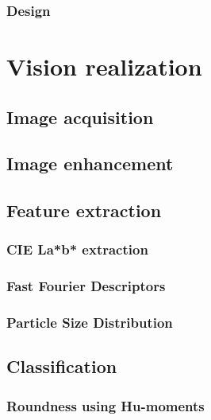 \documentclass[11pt,fleqn,,a4paper,twoside,openright]{book}
\begin{document}
\subsection{Design}

\chapter{Vision realization}


\section{Image acquisition}


\section{Image enhancement}


\section{Feature extraction}\label{Segmentation}


\subsection{CIE La*b* extraction}\label{CIELab}


\subsection{Fast Fourier Descriptors}\label{FFT}

\subsection{Particle Size Distribution}


\section{Classification}

\subsection{Roundness using Hu-moments} \label{HuMoments}
\end{document}
